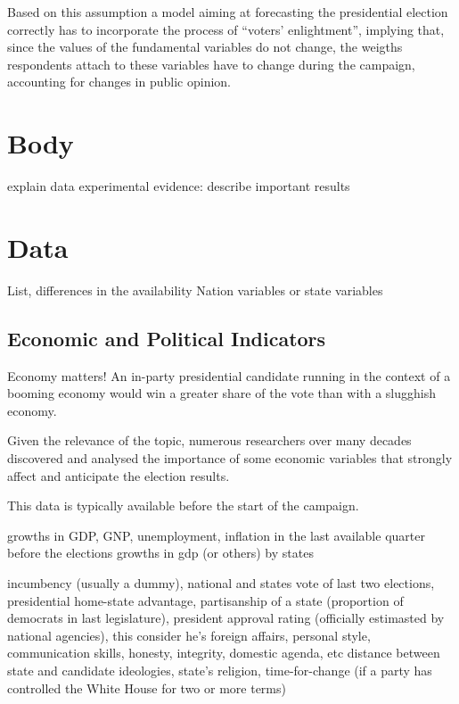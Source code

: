 \documentclass[
  12pt]{article}
\begin{document}
Based on this assumption a model aiming at forecasting the presidential
election correctly has to incorporate the process of ``voters'
enlightment'', implying that, since the values of the fundamental
variables do not change, the weigths respondents attach to these
variables have to change during the campaign, accounting for changes in
public opinion.

\addtolength{\textheight}{-.5in}%

\hypertarget{sec-body}{%
\section{Body}\label{sec-body}}

\addtolength{\textheight}{.5in}%

explain data experimental evidence: describe important results

\addtolength{\textheight}{-.5in}%

\hypertarget{data}{%
\section{Data}\label{data}}

List, differences in the availability Nation variables or state
variables

\hypertarget{economic-and-political-indicators}{%
\subsection{Economic and Political
Indicators}\label{economic-and-political-indicators}}

Economy matters! An in-party presidential candidate running in the
context of a booming economy would win a greater share of the vote than
with a slugghish economy.

Given the relevance of the topic, numerous researchers over many decades
discovered and analysed the importance of some economic variables that
strongly affect and anticipate the election results.

This data is typically available before the start of the campaign.

growths in GDP, GNP, unemployment, inflation in the last available
quarter before the elections growths in gdp (or others) by states

incumbency (usually a dummy), national and states vote of last two
elections, presidential home-state advantage, partisanship of a state
(proportion of democrats in last legislature), president approval rating
(officially estimasted by national agencies), this consider he's foreign
affairs, personal style, communication skills, honesty, integrity,
domestic agenda, etc distance between state and candidate ideologies,
state's religion, time-for-change (if a party has controlled the White
House for two or more terms)
\end{document}

